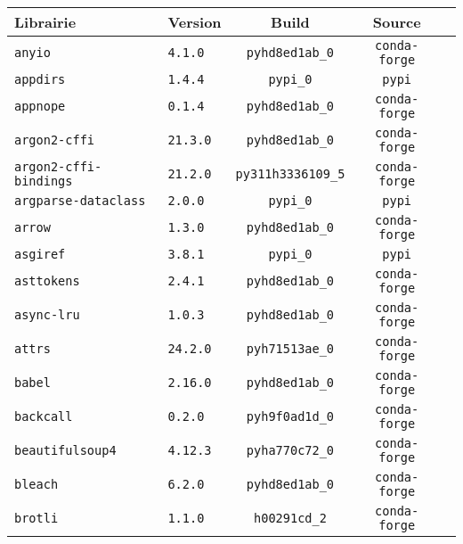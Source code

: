     \begin{longtable}{p{}|l|ccc} \toprule
\textbf{Librairie} & Version & Build & Source \\
\midrule
\texttt{anyio}                     & \texttt{4.1.0}              & \texttt{pyhd8ed1ab\_0}    & \texttt{conda-forge}\\
\texttt{appdirs}                   & \texttt{1.4.4}              & \texttt{pypi\_0}          & \texttt{pypi}\\
\texttt{appnope}                   & \texttt{0.1.4}              & \texttt{pyhd8ed1ab\_0}    & \texttt{conda-forge}\\
\texttt{argon2-cffi}               & \texttt{21.3.0}             & \texttt{pyhd8ed1ab\_0}    & \texttt{conda-forge}\\
\texttt{argon2-cffi-bindings}      & \texttt{21.2.0}             & \texttt{py311h3336109\_5} & \texttt{conda-forge}\\
\texttt{argparse-dataclass}        & \texttt{2.0.0}              & \texttt{pypi\_0}          & \texttt{pypi}\\
\texttt{arrow}                     & \texttt{1.3.0}              & \texttt{pyhd8ed1ab\_0}    & \texttt{conda-forge}\\
\texttt{asgiref}                   & \texttt{3.8.1}              & \texttt{pypi\_0}          & \texttt{pypi}\\
\texttt{asttokens}                 & \texttt{2.4.1}              & \texttt{pyhd8ed1ab\_0}    & \texttt{conda-forge}\\
\texttt{async-lru}                 & \texttt{1.0.3}              & \texttt{pyhd8ed1ab\_0}    & \texttt{conda-forge}\\
\texttt{attrs}                     & \texttt{24.2.0}             & \texttt{pyh71513ae\_0}    & \texttt{conda-forge}\\
\texttt{babel}                     & \texttt{2.16.0}             & \texttt{pyhd8ed1ab\_0}    & \texttt{conda-forge}\\
\texttt{backcall}                  & \texttt{0.2.0}              & \texttt{pyh9f0ad1d\_0}    & \texttt{conda-forge}\\
\texttt{beautifulsoup4}            & \texttt{4.12.3}             & \texttt{pyha770c72\_0}    & \texttt{conda-forge}\\
\texttt{bleach}                    & \texttt{6.2.0}              & \texttt{pyhd8ed1ab\_0}    & \texttt{conda-forge}\\
\texttt{brotli}                    & \texttt{1.1.0}              & \texttt{h00291cd\_2}      & \texttt{conda-forge}\\

\end{longtable}
